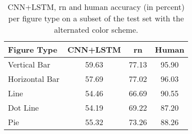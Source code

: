 \documentclass{article} \usepackage{iclr2018_workshop,times}
\begin{document}
\begin{table}[h]
    \caption{CNN+LSTM, \gls{rn} and human accuracy (in percent) per figure type on a subset of the test set with the alternated color scheme.}
    \label{tab:fig-type}
    \begin{center}
        \begin{tabular}{lccc}
            \toprule
            Figure Type & CNN+LSTM & \gls{rn} & Human \\
            \midrule
            Vertical Bar & 59.63 & 77.13 & 95.90 \\
            Horizontal Bar & 57.69 & 77.02 & 96.03 \\
            Line & 54.46 & 66.69 & 90.55 \\
            Dot Line & 54.19 & 69.22 & 87.20 \\
            Pie & 55.32 & 73.26 & 88.26 \\
            \bottomrule
        \end{tabular}
    \end{center}
\end{table}
\end{document}
